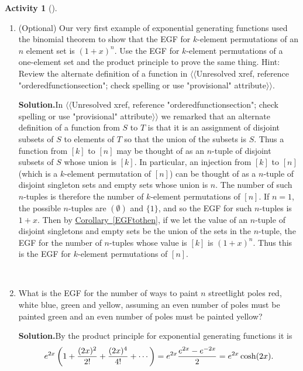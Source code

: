 \documentclass[10pt,]{book}
\theoremstyle{plain}
\theoremstyle{definition}
\newtheorem{activity}[project]{Activity}
\numberwithin{equation}{chapter}
\begin{document}
\begin{activity}[]\label{activity-104}
~\par
\begin{enumerate}[label=(\alph*)]
 \item (Optional) Our very first example of exponential generating functions used the binomial theorem to show that the EGF for \(k\)-element permutations of an \(n\) element set is \((1+x)^n\). Use the EGF for \(k\)-element permutations of a one-element set and the product principle to prove the same thing. Hint: Review the alternate definition of a function in {$\langle\langle$Unresolved xref, reference "orderedfunctionsection"; check spelling or use "provisional" attribute$\rangle\rangle$}.%
\par\medskip\noindent%
\textbf{Solution.}\quad In {$\langle\langle$Unresolved xref, reference "orderedfunctionsection"; check spelling or use "provisional" attribute$\rangle\rangle$} we remarked that an alternate definition of a function from \(S\) to \(T\) is that it is an assignment of disjoint subsets of \(S\) to elements of \(T\) so that the union of the subsets is \(S\). Thus a function from \([k]\) to \([n]\) may be thought of as an \(n\)-tuple of disjoint subsets of \(S\) whose union is \([k]\). In particular, an injection from \([k]\) to \([n]\) (which is a \(k\)-element permutation of \([n]\)) can be thought of as a \(n\)-tuple of disjoint singleton sets and empty sets whose union is \(n\). The number of such \(n\)-tuples is therefore the number of \(k\)-element permutations of \([n]\). If \(n=1\), the possible \(n\)-tuples are \((\emptyset)\) and \(\{1\}\), and so the EGF for such \(n\)-tuples is \(1+x\). Then by \hyperref[EGFtothen]{Corollary~\ref{EGFtothen}}, if we let the value of an \(n\)-tuple of disjoint singletons and empty sets be the union of the sets in the \(n\)-tuple, the EGF for the number of \(n\)-tuples whose value is \([k]\) is \((1+x)^n\). Thus this is the EGF for \(k\)-element permutations of \([n]\).%

~\par
\item What is the EGF for the number of ways to paint \(n\) streetlight poles red, white blue, green and yellow, assuming an even number of poles must be painted green and an even number of poles must be painted yellow?%
\par\medskip\noindent%
\textbf{Solution.}\quad By the product principle for exponential generating functions it is%
\begin{equation*}
e^{2x}\left(1+{(2x)^2\over 2!}+ {(2x)^4\over 4!} + \cdots \right) =
e^{2x}{e^{2x}-e^{-2x}\over2}=e^{2x}\cosh(2x).
\end{equation*}
%

\end{enumerate}
\end{activity}
\end{document}

